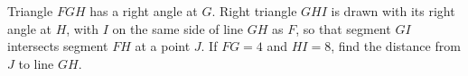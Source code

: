 Triangle $FGH$ has a right angle at $G$. Right triangle $GHI$ is drawn with its right angle at $H$, with $I$ on the same side of line $GH$ as $F$, so that segment $GI$ intersects segment $FH$ at a point $J$. If $FG=4$ and $HI=8$, find the distance from $J$ to line $GH$.
